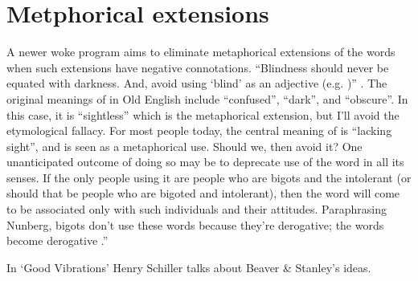 \section{Metphorical extensions}
A newer woke program aims to eliminate metaphorical extensions of the words when such extensions have negative connotations. ``Blindness should never be equated with darkness. And, avoid using `blind' as an adjective (e.g. )'' \citep[8]{Jones2017}. The original meanings of  in Old English include ``confused'', ``dark'', and ``obscure''. In this case, it is ``sightless'' which is the metaphorical extension, but I'll avoid the etymological fallacy. For most people today, the central meaning of  is ``lacking sight'', and  is seen as a metaphorical use. Should we, then avoid it? One unanticipated outcome of doing so may be to deprecate use of the word in all its senses. If the only people using it are people who are bigots and the intolerant (or should that be people who are bigoted and intolerant), then the word will come to be associated only with such individuals and their attitudes. Paraphrasing Nunberg, bigots don't use these words because they're derogative; the words become derogative .”


In ‘Good Vibrations’ Henry Schiller talks about Beaver \& Stanley's ideas.
